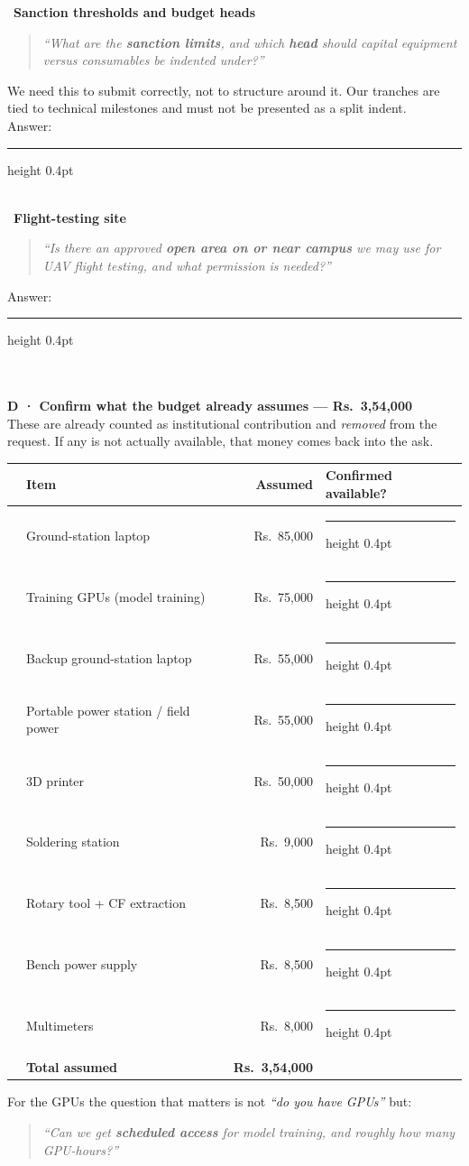\documentclass[10pt,a4paper]{article}
\newcommand{\tick}{\raisebox{-0.8pt}{\framebox[3.0mm]{\rule{0pt}{3.0mm}}}}
\newcommand{\rs}[1]{Rs.~#1}
\newcommand{\writeline}{\textcolor{rule}{\leaders\hrule height 0.4pt\hfill\kern0pt}}
\newcommand{\bigsec}[1]{%
  \vspace{3.5mm}{\color{hi}\rule{\linewidth}{0.9pt}}\\[1.2mm]
  {\bfseries\large #1}\\[0.6mm]
}
\newcommand{\entry}[2]{\tick~\textbf{#1}\hfill\textcolor{dim}{\small #2}\\[0.8mm]}
\newcommand{\ask}[1]{\begin{quote}\vspace{-2mm}\itshape #1\vspace{-2mm}\end{quote}}
\newcommand{\ansline}{\textcolor{dim}{\footnotesize Answer:}~\writeline\\[2.2mm]}
\begin{document}
\entry{Sanction thresholds and budget heads}{}
\ask{``What are the \textbf{sanction limits}, and which \textbf{head} should
capital equipment versus consumables be indented under?''}
{\small We need this to submit correctly, not to structure around it. Our
tranches are tied to technical milestones and must not be presented as a split
indent.}\\[1.2mm]
\ansline

\entry{Flight-testing site}{}
\ask{``Is there an approved \textbf{open area on or near campus} we may use for
UAV flight testing, and what permission is needed?''}
\ansline

\bigsec{D · Confirm what the budget already assumes --- \rs{3,54,000}}

{\small These are already counted as institutional contribution and
\emph{removed} from the request. If any is not actually available, that money
comes back into the ask.}\\[2.5mm]

\begin{tabular}{@{}c p{74mm} r p{52mm}@{}}
\toprule
 & \textbf{Item} & \textbf{Assumed} & \textbf{Confirmed available?}\\
\midrule
\tick & Ground-station laptop            & \rs{85,000} & \writeline\\
\tick & Training GPUs (model training)   & \rs{75,000} & \writeline\\
\tick & Backup ground-station laptop     & \rs{55,000} & \writeline\\
\tick & Portable power station / field power & \rs{55,000} & \writeline\\
\tick & 3D printer                       & \rs{50,000} & \writeline\\
\tick & Soldering station                & \rs{9,000}  & \writeline\\
\tick & Rotary tool + CF extraction      & \rs{8,500}  & \writeline\\
\tick & Bench power supply               & \rs{8,500}  & \writeline\\
\tick & Multimeters                      & \rs{8,000}  & \writeline\\
\midrule
 & \textbf{Total assumed} & \textbf{\rs{3,54,000}} & \\
\bottomrule
\end{tabular}

\vspace{3mm}
For the GPUs the question that matters is not \emph{``do you have GPUs''} but:
\ask{``Can we get \textbf{scheduled access} for model training, and roughly how
many GPU-hours?''}
\end{document}
